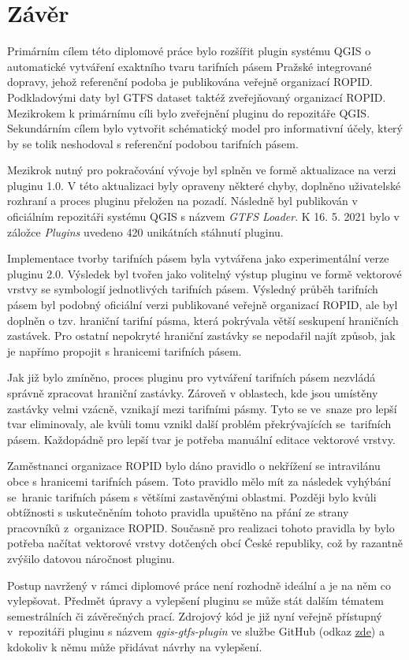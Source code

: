 \chapter*{Závěr}
\label{6-zaver}

Primárním cílem této diplomové práce bylo rozšířit plugin systému QGIS 
o automa\-tické vytváření exaktního tvaru tarifních pásem Pražské integrované dopravy, 
jehož referenční podoba je publikována veřejně organizací ROPID.  
Podkladovými daty byl GTFS dataset taktéž zveřejňovaný organizací ROPID.
Mezikrokem k primárnímu cíli bylo zveřejnění pluginu do repozitáře QGIS. Sekundárním cílem bylo vytvořit schématický model pro 
informativní účely, který by se tolik neshodoval s referenční podobou tarifních pásem.

Mezikrok nutný pro pokračování vývoje byl splněn ve formě aktualizace na verzi pluginu 1.0.
V této aktualizaci byly opraveny některé chyby, doplněno uživatelské rozhraní a proces pluginu přeložen na pozadí. 
Následně byl publikován v oficiálním repozitáři systému QGIS s názvem \textit{GTFS Loader}. 
K 16. 5. 2021 bylo v záložce \textit{Plugins} uvedeno 420 unikátních stáhnutí pluginu.

Implementace tvorby tarifních pásem byla vytvářena jako experimentální verze pluginu 2.0. Výsledek
byl tvořen jako volitelný výstup pluginu ve formě vektorové vrstvy se symbologií jednotlivých tarifních pásem.
Výsledný průběh tarifních pásem byl podobný oficiální verzi publikované veřejně organizací ROPID, ale byl doplněn o tzv. hraniční tarifní pásma,
která pokrývala větší seskupení hraničních zastávek. Pro ostatní nepokryté hraniční zastávky 
se nepodařil najít způsob, jak je napřímo propojit s hranicemi tarifních pásem.

Jak již bylo zmíněno, proces pluginu pro vytváření tarifních pásem nezvládá správně zpracovat hraniční zastávky.
Zároveň v oblastech, kde jsou umístěny zastávky velmi vzácně, vznikají  mezi tarifními pásmy.
Tyto  se ve~snaze pro lepší tvar eliminovaly, ale kvůli tomu vznikl další problém překrývajících se~ta\-rifních pásem.
Každopádně pro lepší tvar je potřeba manuální editace vektorové vrstvy.

Zaměstnanci organizace ROPID bylo dáno pravidlo o nekřížení se intravilánu obce s hranicemi tarifních pásem.
Toto pravidlo mělo mít za následek vyhýbání se~hranic tarifních pásem s většími zastavěnými oblastmi.
Později bylo kvůli obtíž\-nosti s uskutečněním tohoto pravidla upuštěno na přání ze strany pracovníků z~organizace ROPID.
Současně pro realizaci tohoto pravidla by bylo potřeba načítat vektorové vrstvy
dotčených obcí České republiky, což by razantně zvýšilo datovou náročnost pluginu.

Postup navržený v rámci diplomové práce není rozhodně ideální a je na něm co vylepšovat. Předmět úpravy a vylepšení pluginu
se může stát dalším tématem semestrálních či závěrečných prací. Zdrojový kód
je již nyní veřejně přístupný v~repozitáři pluginu s názvem \textit{qgis-gtfs-plugin} ve službe GitHub (odkaz \href{https://github.com/ctu-geoforall-lab/qgis-gtfs-plugin/tree/pid\_zones}
{\underline{zde}}) a kdokoliv k němu může přidávat
návrhy na vylepšení.  

